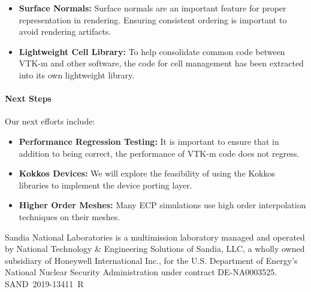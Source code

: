 \begin{itemize}
\item \textbf{Surface Normals:}
  Surface normals are an important feature for proper representation in rendering.
  Ensuring consistent ordering is important to avoid rendering artifacts.
\item \textbf{Lightweight Cell Library:}
  To help consolidate common code between VTK-m and other software, the code for cell management has been extracted into its own lightweight library.
\end{itemize}

\paragraph{Next Steps}
Our next efforts include:

\begin{itemize}
\item \textbf{Performance Regression Testing:}
  It is important to ensure that in addition to being correct, the performance of VTK-m code does not regress.
\item \textbf{Kokkos Devices:}
  We will explore the feasibility of using the Kokkos libraries to implement the device porting layer.
\item \textbf{Higher Order Meshes:}
  Many ECP simulations use high order interpolation techniques on their meshes.
\end{itemize}

\noindent
{\tiny Sandia National Laboratories is a multimission laboratory managed and operated by National Technology \& Engineering Solutions of Sandia, LLC, a wholly owned subsidiary of Honeywell International Inc., for the U.S. Department of Energy's National Nuclear Security Administration under contract DE-NA0003525. \hfill SAND~2019-13411~R
\par}
